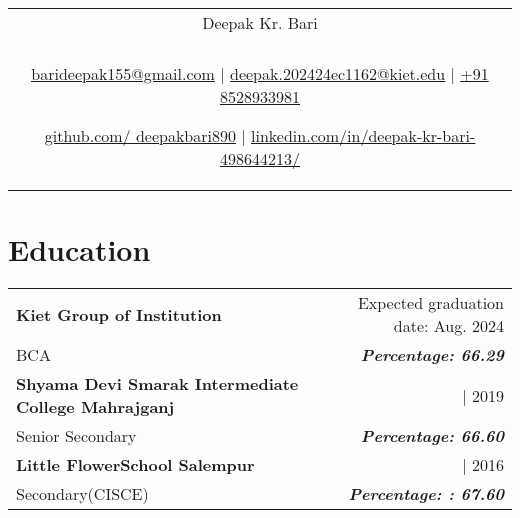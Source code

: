 \documentclass[a4paper,8pt]{article}
\begin{document}
\pagestyle{empty} 


\begin{tabularx}{\linewidth}{@{} C @{}}
\color[HTML]{1C033C} \Huge{Deepak Kr. Bari} \\[6pt]
\\
\textcolor[HTML]{371e77}{\underline{\href{mailto:barideepak155@gmail.com}{\raisebox{-0.05\height}{\faEnvelope} barideepak155@gmail.com}} $|$}
\textcolor[HTML]{371e77}{\underline{\href{mailto:deepak.202424ec1162@kiet.edu}{\raisebox{-0.05\height}{\faEnvelope} deepak.202424ec1162@kiet.edu}} $|$}
\textcolor[HTML]{371e77}{\href{tel:+918528933981}{\raisebox{-0.05\height}{\faMobile} +91 8528933981}}

\textcolor[HTML]{371e77}{\underline{\href{https://github.com/
deepakbari890}{\raisebox{-0.05\height}{\faGithub} github.com/
deepakbari890}} $|$}
\textcolor[HTML]{371e77}{\underline{\href{https://www.linkedin.com/in/deepak-kr-bari-498644213/}{\raisebox{-0.05\height}{\faLinkedin} linkedin.com/in/deepak-kr-bari-498644213/}}}
\end{tabularx}

\section{Education}
\begin{tabularx}{\linewidth}{ @{}l r@{} }
\color[HTML]{1C033C} \textbf{Kiet Group of Institution}\hspace{47ex} & \hfill \color[HTML]{371e77} Expected graduation date: Aug. 2024 \\
\color[HTML]{371e77} BCA  & \hfill \color[HTML]{4B28A4} \textit{\textbf{Percentage: 66.29}} \\
\color[HTML]{1C033C} \textbf{Shyama Devi Smarak Intermediate College Mahrajganj} & \hfill \color[HTML]{371e77} | 2019 \\
\color[HTML]{371e77} Senior Secondary  & \hfill \color[HTML]{4B28A4} \textit{\textbf{Percentage:  66.60}} \\
\color[HTML]{1C033C} \textbf{Little FlowerSchool Salempur} & \hfill \color[HTML]{371e77} | 2016 \\
\color[HTML]{371e77} Secondary(CISCE)  & \hfill \color[HTML]{4B28A4} \textit{\textbf{Percentage: : 67.60}} \\
\end{tabularx}


\end{document}
